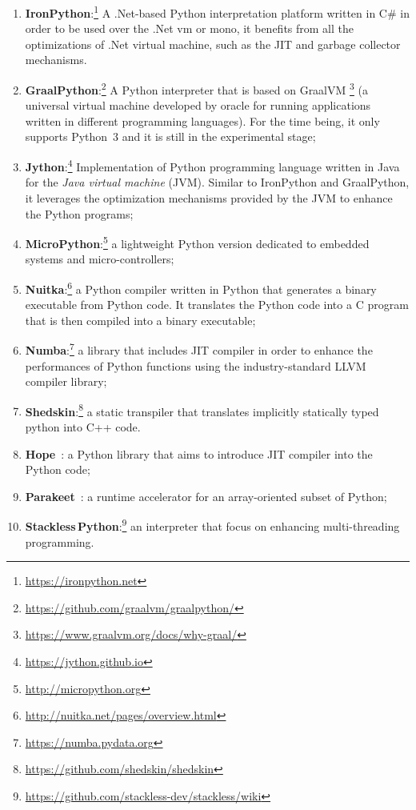 \begin{enumerate}
    \item \textbf{IronPython}:\footnote{\url{https://ironpython.net}} A .Net-based Python interpretation platform written in C\# in order to be used over the .Net vm or mono, it benefits from all the optimizations of .Net virtual machine, such as the JIT and garbage collector mechanisms.
    \item \textbf{GraalPython}:\footnote{\url{https://github.com/graalvm/graalpython/}} A Python interpreter that is based on GraalVM \footnote{\url{https://www.graalvm.org/docs/why-graal/}} (a universal virtual machine developed by oracle for running applications written in different programming languages). For the time being, it only supports Python~3 and it is still in the experimental stage;
    \item \textbf{Jython}:\footnote{\url{https://jython.github.io}} Implementation of Python programming language written in Java for the \emph{Java virtual machine} (JVM). Similar to IronPython and GraalPython, it leverages the optimization mechanisms provided by the JVM to enhance the Python programs;
    \item \textbf{MicroPython}:\footnote{\url{http://micropython.org}} a lightweight Python version dedicated to embedded systems and micro-controllers;
    \item \textbf{Nuitka}:\footnote{\url{http://nuitka.net/pages/overview.html}} a Python compiler written in Python that generates a binary executable from Python code. It translates the Python code into a C program that is then compiled into a binary executable;
    \item \textbf{Numba}:\footnote{\url{https://numba.pydata.org}} a library that includes JIT compiler in order to enhance the performances of Python functions using the industry-standard LLVM compiler library;
    \item \textbf{Shedskin}:\footnote{\url{https://github.com/shedskin/shedskin}} a static transpiler that translates implicitly statically typed python into C++ code.
    \item \textbf{Hope}~\cite{akeret_hope_2015}: a Python library that aims to introduce JIT compiler into the Python code;
    \item \textbf{Parakeet}~\cite{DBLP:conf/hotpar/RubinsteynHWS12}: a runtime accelerator for an array-oriented subset of Python;
    \item \textbf{Stackless\,Python}:\footnote{\url{https://github.com/stackless-dev/stackless/wiki}} an interpreter that focus on enhancing multi-threading programming.

\end{enumerate}
